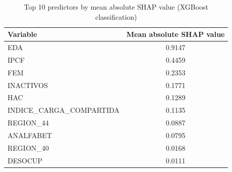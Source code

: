 \begin{table}
\caption{Top 10 predictors by mean absolute SHAP value (XGBoost classification)}
\label{tab:shap_classification}
\begin{tabular}{lc}
\toprule
Variable & Mean absolute SHAP value \\
\midrule
EDA & 0.9147 \\
IPCF & 0.4459 \\
FEM & 0.2353 \\
INACTIVOS & 0.1771 \\
HAC & 0.1289 \\
INDICE\_CARGA\_COMPARTIDA & 0.1135 \\
REGION\_44 & 0.0887 \\
ANALFABET & 0.0795 \\
REGION\_40 & 0.0168 \\
DESOCUP & 0.0111 \\
\bottomrule
\end{tabular}
\end{table}
